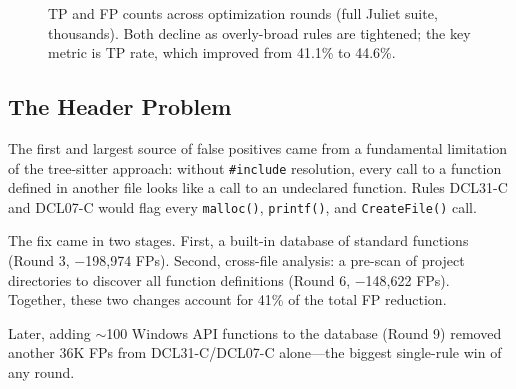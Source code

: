 \documentclass[10pt,twocolumn,letterpaper]{article}
\begin{document}
\begin{figure}[t]
\centering
{}
\caption{TP and FP counts across optimization rounds (full Juliet
suite, thousands).  Both decline as overly-broad rules are tightened;
the key metric is TP rate, which improved from 41.1\% to 44.6\%.}
\label{fig:fp-reduction}
\end{figure}

\subsection{The Header Problem}
\label{sec:fp-cross-file}

The first and largest source of false positives came from a fundamental
limitation of the tree-sitter approach: without \texttt{\#include}
resolution, every call to a function defined in another file looks like
a call to an undeclared function.  Rules DCL31-C and DCL07-C would flag
every \texttt{malloc()}, \texttt{printf()}, and \texttt{CreateFile()}
call.

The fix came in two stages.  First, a built-in database of standard
functions (Round 3, $-$198,974 FPs).  Second, cross-file analysis: a
pre-scan of project directories to discover all function definitions
(Round 6, $-$148,622 FPs).  Together, these two changes account for
41\% of the total FP reduction.

Later, adding $\sim$100 Windows API functions to the database
(Round 9) removed another 36K FPs from DCL31-C/DCL07-C alone---the
biggest single-rule win of any round.
\end{document}
